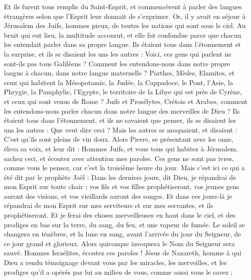 \begin{multicols}{2}
Et ils furent tous remplis du Saint-Esprit, et commencèrent à parler des langues étrangères selon que l'Esprit leur donnait de s’exprimer.
Or, il y avait en séjour à Jérusalem des Juifs, hommes pieux, de toutes les nations qui sont sous le ciel.
Au bruit qui eut lieu, la multitude accourut, et elle fut confondue parce que chacun les entendait parler dans sa propre langue.
Ils étaient tous dans l’étonnement et la surprise, et ils se disaient les uns les autres : Voici, ces gens qui parlent ne sont-ils pas tous Galiléens ?
Comment les entendons-nous dans notre propre langue à chacun, dans notre langue maternelle ?
Parthes, Mèdes, Elamites, et ceux qui habitent la Mésopotamie, la Judée, la Cappadoce, le Pont, l’Asie,
la Phrygie, la Pamphylie, l’Egypte, le territoire de la Libye qui est près de Cyrène, et ceux qui sont venus de Rome ?
Juifs et Prosélytes, Crétois et Arabes, comment les entendons-nous parler chacun dans notre langue des merveilles de Dieu ?
Ils étaient tous dans l’étonnement, et ils ne savaient que penser, ils se disaient les uns les autres : Que veut dire ceci ?
Mais les autres se moquaient, et disaient : C’est qu'ils sont pleins de vin doux.
Alors Pierre, se présentant avec les onze, éleva sa voix, et leur dit : Hommes Juifs, et vous tous qui habitez à Jérusalem, sachez ceci, et écoutez avec attention mes paroles.
Ces gens ne sont pas ivres, comme vous le pensez, car c'est la troisième heure du jour.
Mais c'est ici ce qui a été dit par le prophète Joël :
Dans les derniers jours, dit Dieu, je répandrai de mon Esprit sur toute chair ; vos fils et vos filles prophétiseront, vos jeunes gens auront des visions, et vos vieillards auront des songes.
Et dans ces jours-là je répandrai de mon Esprit sur mes serviteurs et sur mes servantes, et ils prophétiseront.
Et je ferai des choses merveilleuses en haut dans le ciel, et des prodiges en bas sur la terre, du sang, du feu, et une vapeur de fumée.
Le soleil se changera en ténèbres, et la lune en sang, avant l’arrivée du jour du Seigneur, de ce jour grand et glorieux.
Alors quiconque invoquera le Nom du Seigneur sera sauvé.
Hommes Israélites, écoutez ces paroles ! Jésus de Nazareth, homme à qui Dieu a rendu témoignage devant vous par les miracles, les merveilles, et les prodiges qu’il a opérés par lui au milieu de vous, comme aussi vous le savez ;

\end{multicols}
